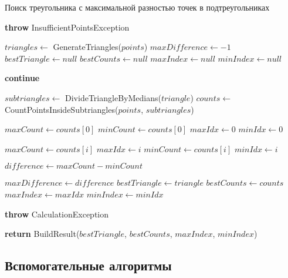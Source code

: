 \documentclass[a4paper,12pt]{article}
\begin{document}
\begin{algorithm}

\caption{Поиск треугольника с максимальной разностью точек в подтреугольниках}
\begin{algorithmic}[1]
        \State \textbf{throw} InsufficientPointsException
    \EndIf
    
    \State $triangles \gets$ GenerateTriangles($points$)
    \State $maxDifference \gets -1$
    \State $bestTriangle \gets null$
    \State $bestCounts \gets null$
    \State $maxIndex \gets null$
    \State $minIndex \gets null$
    
            \State \textbf{continue}
        \EndIf
        
        \State $subtriangles \gets$ DivideTriangleByMedians($triangle$)
        \State $counts \gets$ CountPointsInsideSubtriangles($points$, $subtriangles$)
        
        \State $maxCount \gets counts[0]$
        \State $minCount \gets counts[0]$
        \State $maxIdx \gets 0$
        \State $minIdx \gets 0$
        
                \State $maxCount \gets counts[i]$
                \State $maxIdx \gets i$
            \EndIf
                \State $minCount \gets counts[i]$
                \State $minIdx \gets i$
            \EndIf
        \EndFor
        
        \State $difference \gets maxCount - minCount$
        
            \State $maxDifference \gets difference$
            \State $bestTriangle \gets triangle$
            \State $bestCounts \gets counts$
            \State $maxIndex \gets maxIdx$
            \State $minIndex \gets minIdx$
        \EndIf
    \EndFor
    
        \State \textbf{throw} CalculationException
    \EndIf
    
    \State \textbf{return} BuildResult($bestTriangle$, $bestCounts$, $maxIndex$, $minIndex$)
\EndProcedure
\end{algorithmic}
\end{algorithm}

\newpage
\subsection{Вспомогательные алгоритмы}
\end{document}
